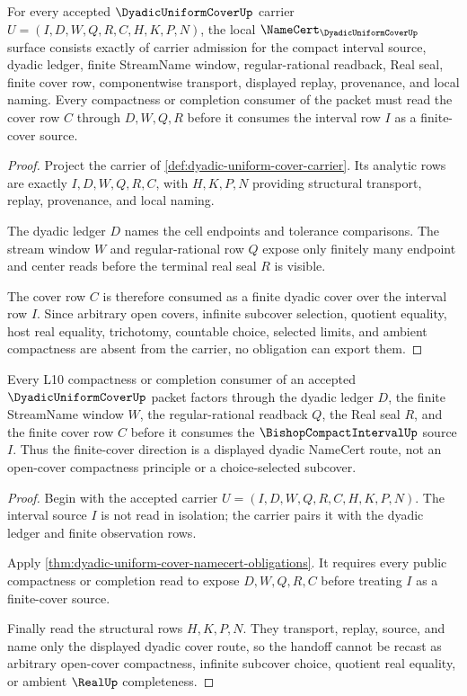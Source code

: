 \begin{theorem}
\label{thm:dyadic-uniform-cover-namecert-obligations}
For every accepted $\DyadicUniformCoverUp$ carrier $U=(I,D,W,Q,R,C,H,K,P,N)$, the local $\NameCert_{\DyadicUniformCoverUp}$ surface consists exactly of carrier admission for the compact interval source, dyadic ledger, finite StreamName window, regular-rational readback, Real seal, finite cover row, componentwise transport, displayed replay, provenance, and local naming. Every compactness or completion consumer of the packet must read the cover row $C$ through $D,W,Q,R$ before it consumes the interval row $I$ as a finite-cover source.
\end{theorem}
\begin{proof}
Project the carrier of \autoref{def:dyadic-uniform-cover-carrier}. Its analytic rows are exactly $I,D,W,Q,R,C$, with $H,K,P,N$ providing structural transport, replay, provenance, and local naming.

The dyadic ledger $D$ names the cell endpoints and tolerance comparisons. The stream window $W$ and regular-rational row $Q$ expose only finitely many endpoint and center reads before the terminal real seal $R$ is visible.

The cover row $C$ is therefore consumed as a finite dyadic cover over the interval row $I$. Since arbitrary open covers, infinite subcover selection, quotient equality, host real equality, trichotomy, countable choice, selected limits, and ambient compactness are absent from the carrier, no obligation can export them.
\end{proof}

\begin{theorem}
\label{thm:dyadic-uniform-cover-l10-handoff}
Every L10 compactness or completion consumer of an accepted $\DyadicUniformCoverUp$ packet factors through the dyadic ledger $D$, the finite StreamName window $W$, the regular-rational readback $Q$, the Real seal $R$, and the finite cover row $C$ before it consumes the $\BishopCompactIntervalUp$ source $I$. Thus the finite-cover direction is a displayed dyadic NameCert route, not an open-cover compactness principle or a choice-selected subcover.
\end{theorem}
\begin{proof}
Begin with the accepted carrier $U=(I,D,W,Q,R,C,H,K,P,N)$. The interval source $I$ is not read in isolation; the carrier pairs it with the dyadic ledger and finite observation rows.

Apply \autoref{thm:dyadic-uniform-cover-namecert-obligations}. It requires every public compactness or completion read to expose $D,W,Q,R,C$ before treating $I$ as a finite-cover source.

Finally read the structural rows $H,K,P,N$. They transport, replay, source, and name only the displayed dyadic cover route, so the handoff cannot be recast as arbitrary open-cover compactness, infinite subcover choice, quotient real equality, or ambient $\RealUp$ completeness.
\end{proof}

